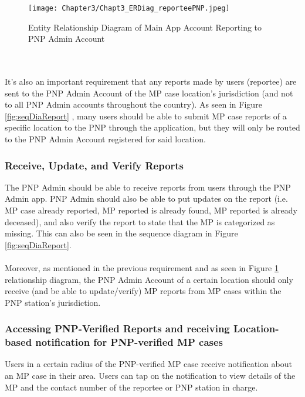 \begin{figure}[!h]
    \centering
    \texttt{[image: Chapter3/Chapt3\_ERDiag\_reporteePNP.jpeg]}
    \caption{Entity Relationship Diagram of Main App Account Reporting to PNP Admin Account}
    \label{fig:ERDReportee}
\end{figure}
\\\\It’s also an important requirement that any reports made by users (reportee) are sent to the PNP Admin Account of the MP case location’s jurisdiction (and not to all PNP Admin accounts throughout the country). As seen in Figure \ref{fig:seqDiaReport} , many users should be able to submit MP case reports of a specific location to the PNP through the application, but they will only be routed to the PNP Admin Account registered for said location.

\subsubsection{Receive, Update, and Verify Reports}
The PNP Admin should be able to receive reports from users through the PNP Admin app. PNP Admin should also be able to put updates on the report (i.e. MP case already reported, MP reported is already found, MP reported is already deceased), and also verify the report to state that the MP is categorized as missing. This can also be seen in the sequence diagram in Figure \ref{fig:seqDiaReport}. 
\\\\Moreover, as mentioned in the previous requirement and as seen in Figure \ref{fig:ERDReportee} relationship diagram, the PNP Admin Account of a certain location should only receive (and be able to update/verify) MP reports from MP cases within the PNP station’s jurisdiction.

\subsubsection{Accessing PNP-Verified Reports and receiving Location-based notification for PNP-verified MP cases}

Users in a certain radius of the PNP-verified MP case receive notification about an MP case in their area. Users can tap on the notification to view details of the MP and the contact number of the reportee or PNP station in charge.


